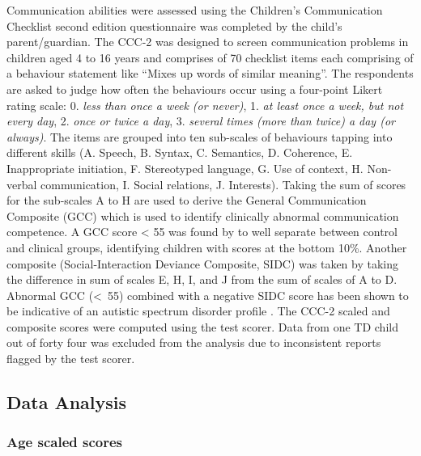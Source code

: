 \documentclass[a4paper, twoside]{templates/ociamthesis}
\begin{document}
Communication abilities were assessed using the Children's Communication Checklist second edition questionnaire \autocite[CCC-2;][]{Bishop2003} was completed by the child's parent/guardian. The CCC-2 was designed to screen communication problems in children aged 4 to 16 years and comprises of 70 checklist items each comprising of a behaviour statement like ``Mixes up words of similar meaning''. The respondents are asked to judge how often the behaviours occur using a four-point Likert rating scale: 0. \emph{less than once a week (or never)}, 1. \emph{at least once a week, but not every day}, 2. \emph{once or twice a day}, 3. \emph{several times (more than twice) a day (or always)}. The items are grouped into ten sub-scales of behaviours tapping into different skills (A. Speech, B. Syntax, C. Semantics, D. Coherence, E. Inappropriate initiation, F. Stereotyped language, G. Use of context, H. Non-verbal communication, I. Social relations, J. Interests). Taking the sum of scores for the sub-scales A to H are used to derive the General Communication Composite (GCC) which is used to identify clinically abnormal communication competence. A GCC score \textless{} 55 was found by \textcite{Norbury2005} to well separate between control and clinical groups, identifying children with scores at the bottom 10\%. Another composite (Social-Interaction Deviance Composite, SIDC) was taken by taking the difference in sum of scales E, H, I, and J from the sum of scales of A to D. Abnormal GCC (\textless~55) combined with a negative SIDC score has been shown to be indicative of an autistic spectrum disorder profile \autocite{Bishop2003}. The CCC-2 scaled and composite scores were computed using the test scorer. Data from one TD child out of forty four was excluded from the analysis due to inconsistent reports flagged by the test scorer.

\hypertarget{data-analysis}{%
\subsection{Data Analysis}\label{data-analysis}}

\hypertarget{age-scaled-scores}{%
\subsubsection{Age scaled scores}\label{age-scaled-scores}}
\end{document}
